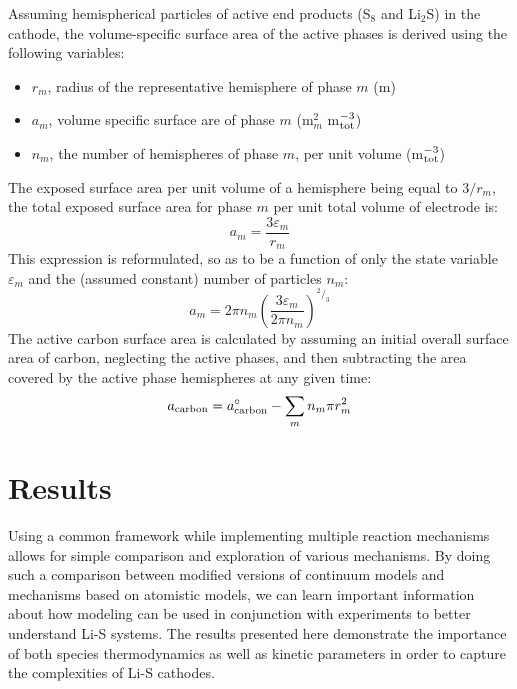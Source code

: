 \documentclass{elsarticle}
\begin{document}
Assuming hemispherical particles of active end products (S$_8$ and Li$_2$S) in the cathode, the volume-specific surface area of the active phases is derived using the following variables:
\begin{itemize}
    \item $r_m$, radius of the representative hemisphere of phase $m$ (m)
    \item $a_m$, volume specific surface are of phase $m$ (m$^2_m$ m$^{-3}_{\rm tot}$)
    \item $n_m$, the number of hemispheres of phase $m$, per unit volume (m$^{-3}_{\rm tot}$)
\end{itemize}
The exposed surface area per unit volume of a hemisphere being equal to $3/r_m$, the total exposed surface area for phase $m$ per unit total volume of electrode is:
\begin{equation}\label{eq:area_per_vol_m_1}
    a_m = \frac{3\varepsilon_m}{r_m}
\end{equation}
This expression is reformulated, so as to be a function of only the state variable $\varepsilon_m$ and the (assumed constant) number of particles $n_m$:
\begin{equation}\label{eq:area_per_vol_m_2}
    a_m = 2\pi n_m\left(\frac{3\varepsilon_m}{2\pi n_m}\right)^{^2/_3}
\end{equation}
The active carbon surface area is calculated by assuming an initial overall surface area of carbon, neglecting the active phases, and then subtracting the area covered by the active phase hemispheres at any given time:
\begin{equation}\label{eq:a_carbon}
    a_{\rm carbon} = a^\circ_{\rm carbon} - \sum_m n_m\pi r_m^2
\end{equation}





\section{Results}

Using a common framework while implementing multiple reaction mechanisms allows for simple comparison and exploration of various mechanisms. By doing such a comparison between modified versions of continuum models and mechanisms based on atomistic models, we can learn important information about how modeling can be used in conjunction with experiments to better understand Li-S systems. The results presented here demonstrate the importance of both species thermodynamics as well as kinetic parameters in order to capture the complexities of Li-S cathodes. 
\end{document}
